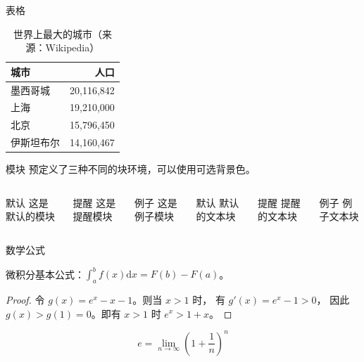 \documentclass[12pt,aspectratio=169]{beamer}
\begin{document}
\begin{frame}{表格}
  \begin{table}
    \caption{世界上最大的城市（来源：Wikipedia）}
    \begin{tabular}{lr}
      \toprule
      城市 & 人口\\
      \midrule
      墨西哥城 & 20,116,842\\
      上海 & 19,210,000\\
      北京 & 15,796,450\\
      伊斯坦布尔 & 14,160,467\\
      \bottomrule
    \end{tabular}
  \end{table}
\end{frame}
\begin{frame}{模块}
  预定义了三种不同的块环境，可以使用可选背景色。

  \begin{columns}[T,onlytextwidth]
      \begin{block}{默认}
        这是默认的模块
      \end{block}

      \begin{alertblock}{提醒}
        这是提醒模块
      \end{alertblock}

      \begin{exampleblock}{例子}
        这是例子模块
      \end{exampleblock}



      \begin{block}{默认}
        默认的文本块
      \end{block}

      \begin{alertblock}{提醒}
        提醒的文本块
      \end{alertblock}

      \begin{exampleblock}{例子}
        例子文本块
      \end{exampleblock}

  \end{columns}
\end{frame}
\begin{frame}{数学公式}
    \begin{theorem}
    微积分基本公式：$\int_a^b f(x)\mathrm{d}x=F(b)-F(a)$。
    \end{theorem}
    \begin{proof}
    令 $g(x)=e^x-x-1$。则当 $x>1$ 时， 有 $g'(x)=e^x-1>0$，
    因此 $g(x)>g(1)=0$。即有 $x>1$ 时 $e^x>1+x$。
    \end{proof}
  \begin{equation*}
    e = \lim_{n\to \infty} \left(1 + \frac{1}{n}\right)^n
  \end{equation*}
\end{frame}
\end{document}
